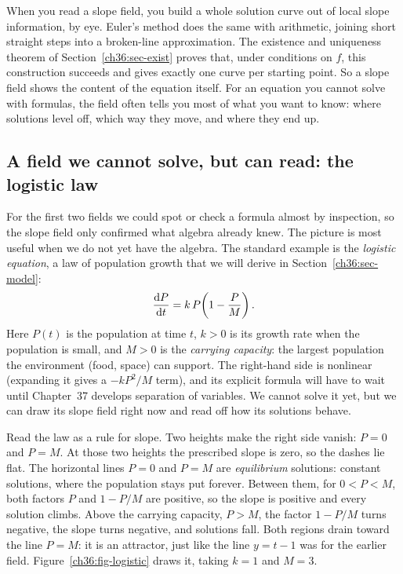 \begin{happeningbox}
When you read a slope field, you build a whole solution curve out of local slope information, by eye. Euler's method does the same with arithmetic, joining short straight steps into a broken-line approximation. The existence and uniqueness theorem of Section~\ref{ch36:sec-exist} proves that, under conditions on $f$, this construction succeeds and gives exactly one curve per starting point. So a slope field shows the content of the equation itself. For an equation you cannot solve with formulas, the field often tells you most of what you want to know: where solutions level off, which way they move, and where they end up.
\end{happeningbox}

\subsection{A field we cannot solve, but can read: the logistic law}
\label{ch36:sub-logistic-field}

For the first two fields we could spot or check a formula almost by inspection, so the slope field only confirmed what algebra already knew. The picture is most useful when we do not yet have the algebra. The standard example is the \emph{logistic equation}, a law of population growth that we will derive in Section~\ref{ch36:sec-model}:
\[
  \frac{\mathrm{d} P}{\mathrm{d} t} = k\,P\!\left(1 - \frac{P}{M}\right).
\]
Here $P(t)$ is the population at time $t$, $k>0$ is its growth rate when the population is small, and $M>0$ is the \emph{carrying capacity}: the largest population the environment (food, space) can support. The right-hand side is nonlinear (expanding it gives a $-kP^2/M$ term), and its explicit formula will have to wait until Chapter~37 develops separation of variables. We cannot solve it yet, but we can draw its slope field right now and read off how its solutions behave.

Read the law as a rule for slope. Two heights make the right side vanish: $P=0$ and $P=M$. At those two heights the prescribed slope is zero, so the dashes lie flat. The horizontal lines $P=0$ and $P=M$ are \emph{equilibrium} solutions: constant solutions, where the population stays put forever. Between them, for $0 < P < M$, both factors $P$ and $1-P/M$ are positive, so the slope is positive and every solution climbs. Above the carrying capacity, $P > M$, the factor $1-P/M$ turns negative, the slope turns negative, and solutions fall. Both regions drain toward the line $P=M$: it is an attractor, just like the line $y=t-1$ was for the earlier field. Figure~\ref{ch36:fig-logistic} draws it, taking $k=1$ and $M=3$.

